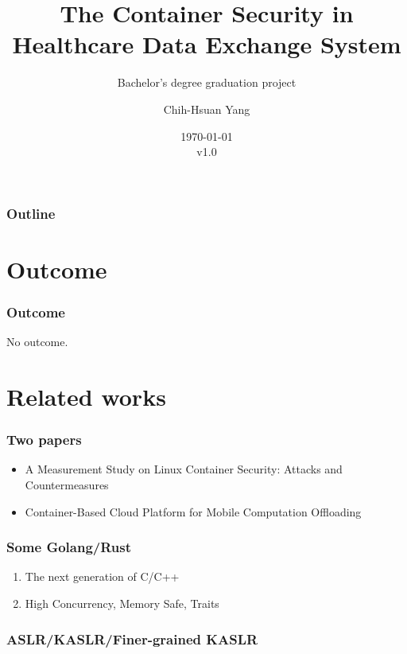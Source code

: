 \documentclass{beamer}
\title{The Container Security in Healthcare Data Exchange System}
\subtitle{Bachelor's degree graduation project}
\author{Chih-Hsuan Yang}
\institute{National Sun Yat-sen University}
\date{\today\\v1.0}
\begin{document}
\begin{CJK*}{UTF8}{bsmi}

    \begin{frame}
        \titlepage
    \end{frame}

    \begin{frame}
        \frametitle{Outline}
        \tableofcontents
    \end{frame}

    \section{Outcome}
    \begin{frame}
        \frametitle{Outcome}
        \centering \Large {No outcome.}
    \end{frame}



    \section{Related works}
    \begin{frame}
        \frametitle{Two papers}
        \begin{itemize}
            \item A Measurement Study on Linux Container Security: Attacks and Countermeasures\cite{Measurement}
            \item Container-Based Cloud Platform for Mobile Computation Offloading\cite{Offloading}
        \end{itemize}
    \end{frame}

    \begin{frame}
        \frametitle{Some Golang/Rust}
        \begin{enumerate}
            \item The next generation of C/C++
            \item High Concurrency, Memory Safe, Traits
        \end{enumerate}
    \end{frame}

    \begin{frame}
        \frametitle{ASLR/KASLR/Finer-grained KASLR}
    \end{frame}


\end{CJK*}
\end{document}
